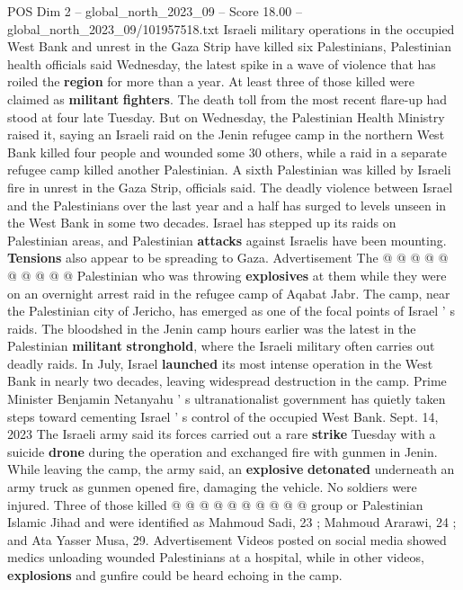 \begin{textsample}{POS Dim 2 – global\_north\_2023\_09 – Score 18.00 – global\_north\_2023\_09/101957518.txt}  \label{ex:f2_pos_131}
Israeli military operations in the occupied West Bank and unrest in the Gaza Strip have killed six Palestinians, Palestinian health officials said Wednesday, the latest spike in a wave of violence that has roiled the \textbf{region} for more than a year.
At least three of those killed were claimed as \textbf{militant} \textbf{fighters}.
The death toll from the most recent flare-up had stood at four late Tuesday.
But on Wednesday, the Palestinian Health Ministry raised it, saying an Israeli raid on the Jenin refugee camp in the northern West Bank killed four people and wounded some 30 others, while a raid in a separate refugee camp killed another Palestinian.
A sixth Palestinian was killed by Israeli fire in unrest in the Gaza Strip, officials said.
The deadly violence between Israel and the Palestinians over the last year and a half has surged to levels unseen in the West Bank in some two decades.
Israel has stepped up its raids on Palestinian areas, and Palestinian \textbf{attacks} against Israelis have been mounting. \textbf{Tensions} also appear to be spreading to Gaza.
Advertisement The @ @ @ @ @ @ @ @ @ @ Palestinian who was throwing \textbf{explosives} at them while they were on an overnight arrest raid in the refugee camp of Aqabat Jabr.
The camp, near the Palestinian city of Jericho, has emerged as one of the focal points of Israel ' s raids.
The bloodshed in the Jenin camp hours earlier was the latest in the Palestinian \textbf{militant} \textbf{stronghold}, where the Israeli military often carries out deadly raids.
In July, Israel \textbf{launched} its most intense operation in the West Bank in nearly two decades, leaving widespread destruction in the camp.
Prime Minister Benjamin Netanyahu ' s ultranationalist government has quietly taken steps toward cementing Israel ' s control of the occupied West Bank.
Sept. 14, 2023 The Israeli army said its forces carried out a rare \textbf{strike} Tuesday with a suicide \textbf{drone} during the operation and exchanged fire with gunmen in Jenin.
While leaving the camp, the army said, an \textbf{explosive} \textbf{detonated} underneath an army truck as gunmen opened fire, damaging the vehicle.
No soldiers were injured.
Three of those killed @ @ @ @ @ @ @ @ @ @ group or Palestinian Islamic Jihad and were identified as Mahmoud Sadi, 23 ; Mahmoud Ararawi, 24 ; and Ata Yasser Musa, 29.
Advertisement Videos posted on social media showed medics unloading wounded Palestinians at a hospital, while in other videos, \textbf{explosions} and gunfire could be heard echoing in the camp.

\end{textsample}
